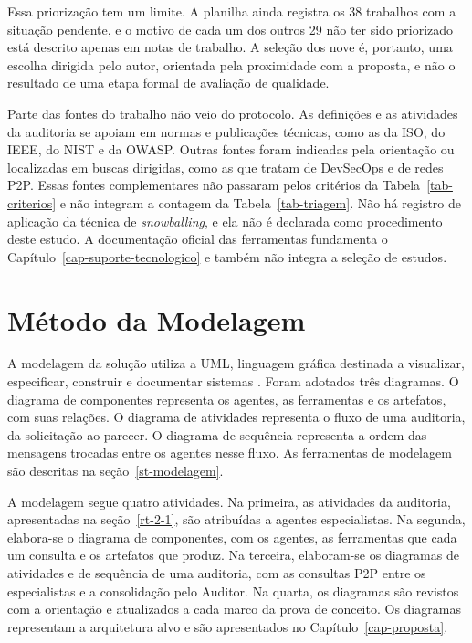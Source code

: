 Essa priorização tem um limite. A planilha ainda registra os 38 trabalhos com a situação pendente, e o motivo de cada um dos outros 29 não ter sido priorizado está descrito apenas em notas de trabalho. A seleção dos nove é, portanto, uma escolha dirigida pelo autor, orientada pela proximidade com a proposta, e não o resultado de uma etapa formal de avaliação de qualidade.

Parte das fontes do trabalho não veio do protocolo. As definições e as atividades da auditoria se apoiam em normas e publicações técnicas, como as da ISO, do IEEE, do NIST e da OWASP. Outras fontes foram indicadas pela orientação ou localizadas em buscas dirigidas, como as que tratam de DevSecOps e de redes P2P. Essas fontes complementares não passaram pelos critérios da Tabela~\ref{tab-criterios} e não integram a contagem da Tabela~\ref{tab-triagem}. Não há registro de aplicação da técnica de \textit{snowballing}, e ela não é declarada como procedimento deste estudo. A documentação oficial das ferramentas fundamenta o Capítulo~\ref{cap-suporte-tecnologico} e também não integra a seleção de estudos.

\section{Método da Modelagem}
\label{met-modelagem}

A modelagem da solução utiliza a UML, linguagem gráfica destinada a visualizar, especificar, construir e documentar sistemas \cite{omgUml}. Foram adotados três diagramas. O diagrama de componentes representa os agentes, as ferramentas e os artefatos, com suas relações. O diagrama de atividades representa o fluxo de uma auditoria, da solicitação ao parecer. O diagrama de sequência representa a ordem das mensagens trocadas entre os agentes nesse fluxo. As ferramentas de modelagem são descritas na seção~\ref{st-modelagem}.

A modelagem segue quatro atividades. Na primeira, as atividades da auditoria, apresentadas na seção~\ref{rt-2-1}, são atribuídas a agentes especialistas. Na segunda, elabora-se o diagrama de componentes, com os agentes, as ferramentas que cada um consulta e os artefatos que produz. Na terceira, elaboram-se os diagramas de atividades e de sequência de uma auditoria, com as consultas P2P entre os especialistas e a consolidação pelo Auditor. Na quarta, os diagramas são revistos com a orientação e atualizados a cada marco da prova de conceito. Os diagramas representam a arquitetura alvo e são apresentados no Capítulo~\ref{cap-proposta}.

